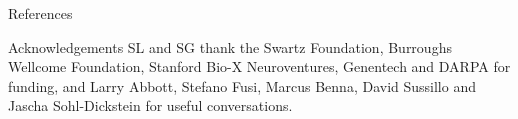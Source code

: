 \documentclass[final,hyperref={pdfpagelabels=false,bookmarks=false}]{beamer}
\begin{document}
\begin{frame}{}
\begin{columns}[t]
\begin{column}{0.33\linewidth}

\begin{block}{References}
%
 {\small
 
 
 }
%
\end{block}


\begin{block}{Acknowledgements}
%
 SL and SG thank the Swartz Foundation, Burroughs Wellcome Foundation, Stanford Bio-X Neuroventures, Genentech and DARPA for funding, and Larry Abbott, Stefano Fusi, Marcus Benna, David Sussillo and Jascha Sohl-Dickstein for useful conversations.

%
\end{block}


\end{column}





\end{columns}

\end{frame}
\end{document}
